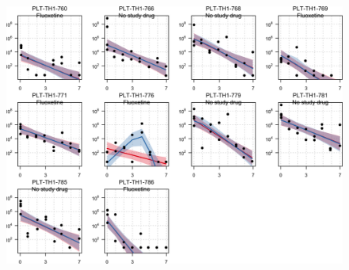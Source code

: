 \documentclass[
  letterpaper,
  DIV=11,
  numbers=noendperiod]{scrartcl}
\begin{document}
\begin{figure}[H]

{\centering \includegraphics{Fluoxetine_analysis_files/figure-pdf/individ_data-17.png}

}

\end{figure}
\end{document}
